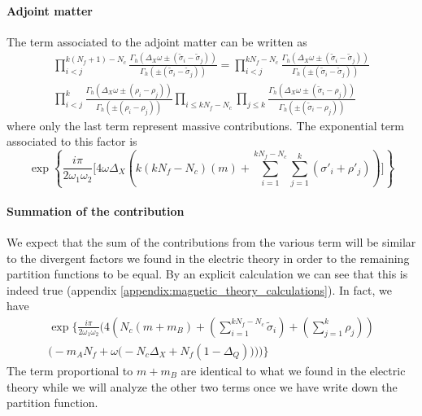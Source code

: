 \paragraph{Adjoint matter}
The term associated to the adjoint matter can be written as
\begin{multline}
 \prod_{  i<j }^{k(N_f+1)- N_c } \frac{ \Gamma_h( \Delta_X \omega \pm (\tilde{\sigma}_i - \tilde{\sigma}_j)) }{ \Gamma_h ( \pm (\tilde{\sigma}_i - \tilde{\sigma}_j) )} = 
 \prod_{i<j}^{kN_f- N_c } \frac{ \Gamma_h( \Delta_X \omega \pm (\tilde{\sigma}_i - \tilde{\sigma}_j)) }{ \Gamma_h ( \pm (\tilde{\sigma}_i - \tilde{\sigma}_j) )}
\\
 \prod_{ i<j }^{k } \frac{ \Gamma_h( \Delta_X \omega \pm (\rho_i - \rho_j)) }{ \Gamma_h ( \pm (\rho_i - \rho_j) )}
	\prod_{i \leq k N_f - N_c} \prod_{ j \leq k}  \frac{ \Gamma_h( \Delta_X \omega \pm (\tilde{\sigma}_i - \rho_j)) }{ \Gamma_h ( \pm (\tilde{\sigma}_i - \rho_j) )}
\end{multline}
where only the last term represent massive contributions. The exponential term associated to this factor is
\begin{equation}
\exp 
\left\{ \frac{i \pi}{2 \omega_1 \omega_2}
\biggl[ 
 4 \omega \Delta_X \left( k ( k N_f - N_c)   (m ) + \sum_{i=1}^{k N_f -N_c} \sum_{j=1}^{k }  ( \sigma'_i + \rho'_j)\right)
	\biggr]
	\right\}
\end{equation}

\paragraph{Summation of the contribution}
We expect that the sum of the contributions from the various term will be similar to the divergent factors we found in the electric theory in order to the remaining partition functions to be equal.
By an explicit calculation we can see that this is indeed true (appendix \ref{appendix:magnetic_theory_calculations}).
In fact, we have
\begin{multline}
\exp \Biggl\{ \frac{i \pi}{2 \omega_1 \omega_2}
\Biggl( 4 \left( N_c (m + m_B) + \left(\sum_{i=1}^{k N_f - N_c} \tilde{\sigma}_i \right) + \left(\sum_{j=1}^{k} \rho_j  \right) \right)
\\
	\bigg( - m_A N_f + \omega \big(  -N_c \Delta_X + N_f ( 1 - \Delta_Q ) \big) \bigg) \Biggr) 
\Biggr\}
\end{multline}
The term proportional to $m+m_B$ are identical to what we found in the electric theory while we will analyze the other two terms once we have write down the partition function.

